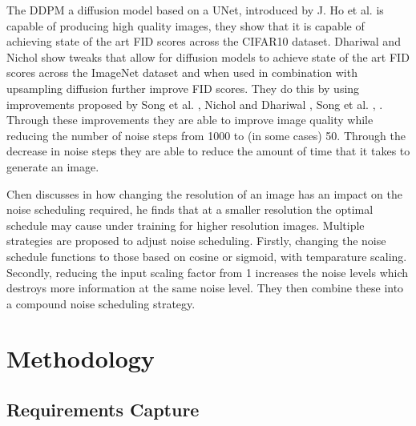 \documentclass{UoYCSproject}
\begin{document}
The DDPM a diffusion model based on a UNet, introduced by J. Ho et al. \cite{ho2020denoising} is capable of producing high quality images, they show that it is capable of achieving state of the art FID scores across the CIFAR10 dataset. Dhariwal and Nichol \cite{dhariwal2021diffusion} show tweaks that allow for diffusion models to achieve state of the art FID scores across the ImageNet dataset and when used in combination with upsampling diffusion further improve FID scores. They do this by using improvements proposed by Song et al. \cite{song2022denoising}, Nichol and Dhariwal \cite{nichol2021improved}, Song et al. \cite{song2021scorebased}, \cite{brock2019large} \cite{karras2019stylebased}. Through these improvements they are able to improve image quality while reducing the number of noise steps from 1000 to (in some cases) 50. Through the decrease in noise steps they are able to reduce the amount of time that it takes to generate an image.  


Chen discusses in \cite{chen2023importance} how changing the resolution of an image has an impact on the noise scheduling required, he finds that at a smaller resolution the optimal schedule may cause under training for higher resolution images. Multiple strategies are proposed to adjust noise scheduling. Firstly, changing the noise schedule functions to those based on cosine or sigmoid, with temparature scaling. Secondly, reducing the input scaling factor from 1 increases the noise levels which destroys more information at the same noise level. They then combine these into a compound noise scheduling strategy.

\newpage{}

\chapter{Methodology}



\section{Requirements Capture}
\end{document}
